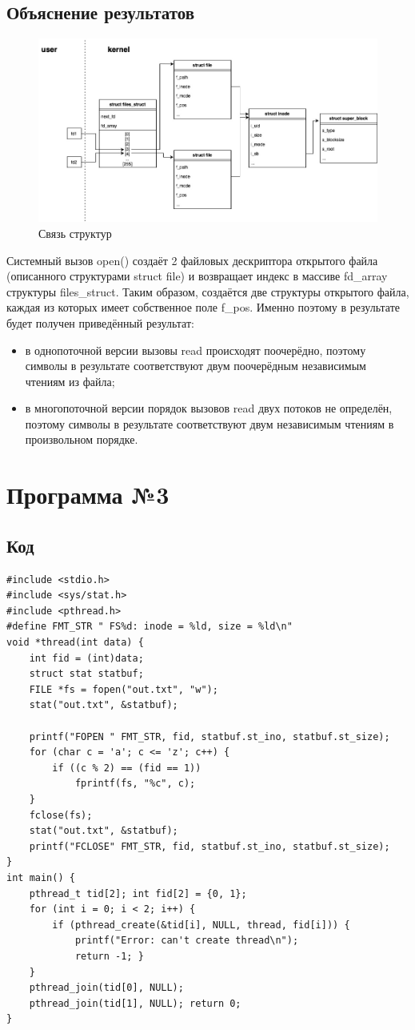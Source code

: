 \documentclass[12pt]{report}
\begin{document}
\subsection*{Объяснение результатов}
\begin{figure}[H]
	\centering
	\includegraphics[scale=0.45]{os_lab_05-2.jpg}
	\caption{Связь структур}
	\label{fig:1}
\end{figure}
Системный вызов open() создаёт 2 файловых дескриптора открытого файла (описанного структурами struct file) и возвращает индекс в массиве fd\_array структуры files\_struct. Таким образом, создаётся две структуры открытого файла, каждая из которых имеет собственное поле f\_pos. Именно поэтому в результате будет получен приведённый результат:
\begin{itemize}
    \item в однопоточной версии вызовы read происходят поочерёдно, поэтому символы в результате соответствуют двум поочерёдным независимым чтениям из файла;
    \item в многопоточной версии порядок вызовов read двух потоков не определён, поэтому символы в результате соответствуют двум независимым чтениям в произвольном порядке.
\end{itemize}
\section*{Программа №3}
\subsection*{Код}
\begin{lstlisting}
#include <stdio.h>
#include <sys/stat.h>
#include <pthread.h>
#define FMT_STR " FS%d: inode = %ld, size = %ld\n"
void *thread(int data) {
    int fid = (int)data;
    struct stat statbuf;
    FILE *fs = fopen("out.txt", "w");
    stat("out.txt", &statbuf);

    printf("FOPEN " FMT_STR, fid, statbuf.st_ino, statbuf.st_size);
    for (char c = 'a'; c <= 'z'; c++) {
        if ((c % 2) == (fid == 1))
            fprintf(fs, "%c", c);
    }
    fclose(fs);
    stat("out.txt", &statbuf);
    printf("FCLOSE" FMT_STR, fid, statbuf.st_ino, statbuf.st_size);
}
int main() {
    pthread_t tid[2]; int fid[2] = {0, 1};
    for (int i = 0; i < 2; i++) {
        if (pthread_create(&tid[i], NULL, thread, fid[i])) {
            printf("Error: can't create thread\n");
            return -1; }
    }
    pthread_join(tid[0], NULL);
    pthread_join(tid[1], NULL); return 0;
}
\end{lstlisting}
\end{document}
